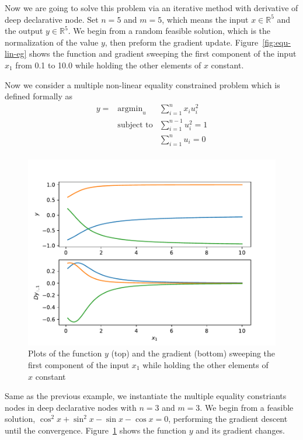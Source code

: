 \par Now we are going to solve this problem via an iterative method with derivative of deep declarative node. Set $n=5$ and $m=5$, which means the input $x \in \mathbb{R}^5$ and the output $y \in \mathbb{R}^5$. We begin from a random feasible solution, which is the normalization of the value $y$, then preform the gradient update. Figure~\ref{fig:equ-lin-eg} shows the function and gradient sweeping the first component of the input $x_1$ from 0.1 to 10.0 while holding the other elements of $x$ constant. 
\par Now we consider a multiple non-linear equality constrained problem which is defined formally as
\begin{equation}
    \begin{array}{rll}
        y =& \text{argmin}_u & \sum_{i=1}^{n} x_i u_i^{2} \\
        & \text{subject to} & \sum_{i=1}^{n-1} u_i^2 = 1 \\
        & & \sum_{i=1}^{n} u_i = 0 \\
    \end{array}
\end{equation}
\begin{figure}[t]
    \label{fig:equ-nonlin-eg}
    \centering
    \includegraphics[page=1,width=.8\textwidth]{figs/multiple_equality_example.pdf} 
    \caption{Plots of the function $y$ (top) and the gradient (bottom) sweeping the first component of the input $x_1$ while holding the other elements of $x$ constant}
\end{figure}
\par Same as the previous example, we instantiate the multiple equality constriants nodes in deep declarative nodes with $n=3$ and $m=3$. We begin from a feasible solution, $\cos^2 x + \sin^2 x - \sin x - \cos x = 0$, performing the gradient descent until the convergence. Figure~\ref{fig:equ-nonlin-eg} shows the function $y$ and its gradient changes. 
